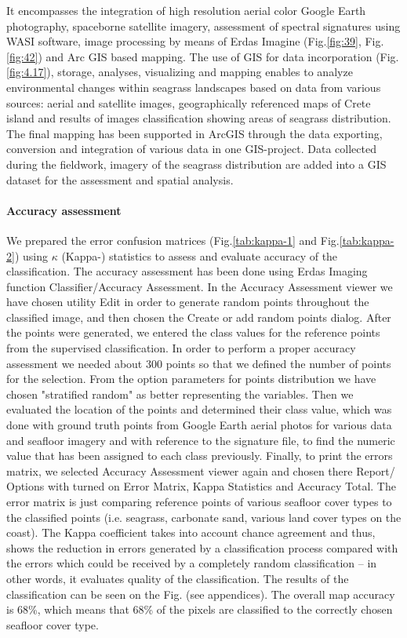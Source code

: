 \documentclass[11pt]{article}
\begin{document}
It encompasses the integration of
high resolution aerial color Google Earth photography, spaceborne satellite imagery, assessment of
spectral signatures using \ac{WASI} software, image processing by means of Erdas Imagine (Fig.\ref{fig:39}, Fig.\ref{fig:42}) and Arc \ac{GIS} based mapping. The use of \ac{GIS} for data incorporation (Fig.\ref{fig:4.17}), storage, analyses, visualizing and mapping
enables to analyze environmental changes within seagrass landscapes based on data from various
sources: aerial and satellite images, geographically referenced maps of Crete island and results of
images classification showing areas of seagrass distribution.
The final mapping has been supported in ArcGIS through the data exporting, conversion and
integration of various data in one \ac{GIS}-project. Data collected during the fieldwork, imagery
of the seagrass distribution are added into a \ac{GIS} dataset for the assessment and spatial analysis.
\paragraph{Accuracy assessment}\label{page-50acc}
We prepared the error confusion matrices (Fig.\ref{tab:kappa-1} and Fig.\ref{tab:kappa-2}) using $\kappa$ (Kappa-) statistics to assess and evaluate accuracy of the classification. The accuracy assessment has been done using Erdas Imaging function Classifier/Accuracy Assessment. In the Accuracy Assessment viewer we have chosen utility Edit in order to generate random points throughout the classified image, and then chosen the Create or add random points dialog. After the points were generated, we entered the class values for the reference points from the supervised classification. In order to perform a proper accuracy assessment we needed about 300 points so that we defined the number of points for the selection. From the option parameters for points distribution we have chosen "stratified random" as better representing the variables. Then we evaluated the location of the points and determined their class value, which was done with ground truth points from Google Earth aerial photos for various data and seafloor imagery and with reference to the signature file, to find the numeric value that has been assigned to each class previously. Finally, to print the errors matrix, we selected Accuracy Assessment viewer again and chosen there Report/ Options with turned on Error Matrix, Kappa Statistics and Accuracy Total. The error matrix is just comparing reference points of various seafloor cover types to the classified points (i.e. seagrass, carbonate sand, various land cover types on the coast). The Kappa coefficient takes into account chance agreement and thus, shows the reduction in errors generated by a classification process compared with the errors which could be received by a completely random classification – in other words, it evaluates quality of the classification. The results of the classification can be seen on the Fig. (see appendices). The overall map accuracy is 68\%, which means that 68\% of the pixels are classified to the correctly chosen seafloor cover type.
\pagebreak
\end{document}

